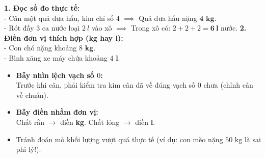 \documentclass[11pt,a4paper]{article}
\begin{document}
\vspace{-1.5mm}
\noindent
\begin{minipage}[t]{0.49\textwidth}\vspace{0pt}
\begin{tcolorbox}[
  enhanced,
  colback=green!4!white,
  colframe=green!60!black,
  arc=2mm, boxrule=0.8pt,
  left=2mm, right=2mm, top=1.8mm, bottom=1.8mm,
  title={\footnotesize\bfseries\color{white}\faCheckCircle\ 4. Ví dụ thực hành chuẩn mực}
]
{\footnotesize
\textbf{1. Đọc số đo thực tế:}\\
- Cân một quả dưa hấu, kim chỉ số $4$ $\implies$ Quả dưa hấu nặng $\mathbf{4\text{ kg}}$.\\
- Rót đầy $3$ ca nước loại $2\ l$ vào xô $\implies$ Trong xô có: $2 + 2 + 2 = \mathbf{6\ l}$ nước.
\textbf{2. Điền đơn vị thích hợp (kg hay l):}\\
- Con chó nặng khoảng $8$ \textbf{kg}.\\
- Bình xăng xe máy chứa khoảng $4$ \textbf{l}.
}
\end{tcolorbox}
\end{minipage}
\hfill
\begin{minipage}[t]{0.49\textwidth}\vspace{0pt}
\begin{tcolorbox}[
  enhanced,
  colback=red!4!white,
  colframe=red!75!black,
  arc=2mm, boxrule=0.8pt,
  left=2mm, right=2mm, top=1.8mm, bottom=1.8mm,
  title={\footnotesize\bfseries\color{white}\faExclamationTriangle\ 5. Mẹo tránh bẫy trắc nghiệm}
]
{\footnotesize
\begin{itemize}\setlength{\itemsep}{1pt}\setlength{\leftskip}{-2.5mm}
  \item \textbf{Bẫy nhìn lệch vạch số $0$:}\\
  Trước khi cân, phải kiểm tra kim cân đã về đúng vạch số $0$ chưa (chỉnh cân về chuẩn).
  \item \textbf{Bẫy điền nhầm đơn vị:}\\
  Chất rắn $\to$ điền \textbf{kg}. Chất lỏng $\to$ điền \textbf{l}.
  \item Tránh đoán mò khối lượng vượt quá thực tế (ví dụ: con mèo nặng $50\text{ kg}$ là sai phi lý!).
\end{itemize}
}
\end{tcolorbox}
\end{minipage}
\end{document}
